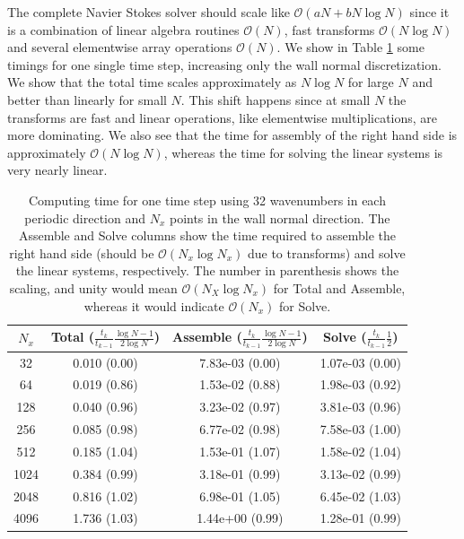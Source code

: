 \documentclass[preprint]{elsarticle}
\begin{document}
The complete Navier Stokes solver should scale like $\mathcal{O}(aN + bN\log N)$ since it is a combination of linear algebra routines $\mathcal{O}(N)$, fast transforms $\mathcal{O}(N \log N)$ and several elementwise array operations $\mathcal{O}(N)$. We show in Table \ref{tab:timings_solver} some timings for one single time step, increasing only the wall normal discretization. We show that the total time scales approximately as $N \log N$ for large $N$ and better than linearly for small $N$. This shift happens since at small $N$ the transforms are fast and linear operations, like elementwise multiplications, are more dominating. We also see that the time for assembly of the right hand side is approximately $\mathcal{O}(N \log N)$, whereas the time for solving the linear systems is very nearly linear.

\begin{table}
	\centering
	\caption{Computing time for one time step using 32 wavenumbers in each periodic direction and $N_x$ points in the wall normal direction. The Assemble and Solve columns show the time required to assemble the right hand side (should be $\mathcal{O}(N_x \log N_x)$ due to transforms) and solve the linear systems, respectively. The number in parenthesis shows the scaling, and unity would mean $\mathcal{O}(N_X \log N_x)$ for Total and Assemble, whereas it would indicate $\mathcal{O}(N_x)$ for Solve. \label{tab:timings_solver}}
	\begin{tabular}{cccc}	
$N_x$ & Total ($\frac{t_k }{t_{k-1}} \frac{\log N-1}{2 \log N}$) & Assemble ($\frac{t_k }{t_{k-1}} \frac{\log N-1}{2 \log N}$) & Solve ($\frac{t_k}{t_{k-1}} \frac{1}{2}$) \\ 
\hline
32 & 0.010 (0.00) & 7.83e-03 (0.00) & 1.07e-03 (0.00) \\ 
64 & 0.019 (0.86) & 1.53e-02 (0.88) & 1.98e-03 (0.92) \\ 
128 & 0.040 (0.96) & 3.23e-02 (0.97) & 3.81e-03 (0.96) \\ 
256 & 0.085 (0.98) & 6.77e-02 (0.98) & 7.58e-03 (1.00) \\ 
512 & 0.185 (1.04) & 1.53e-01 (1.07) & 1.58e-02 (1.04) \\ 
1024 & 0.384 (0.99) & 3.18e-01 (0.99) & 3.13e-02 (0.99) \\ 
2048 & 0.816 (1.02) & 6.98e-01 (1.05) & 6.45e-02 (1.03) \\ 
4096 & 1.736 (1.03) & 1.44e+00 (0.99) & 1.28e-01 (0.99)
    \end{tabular}
\end{table}
\end{document}
